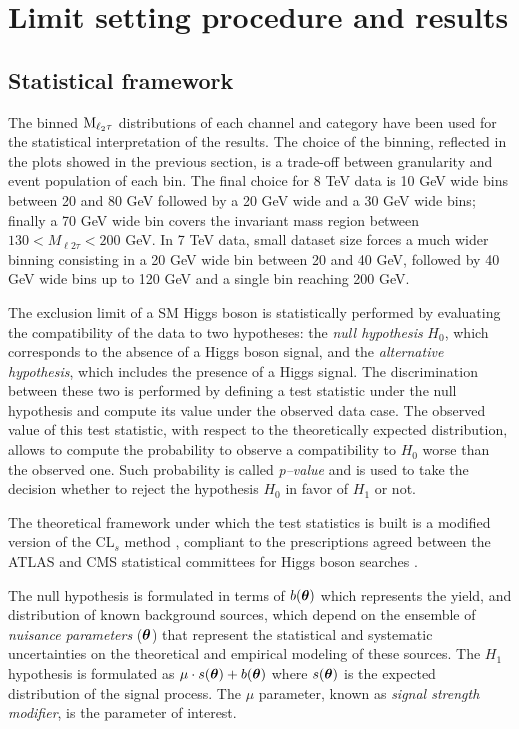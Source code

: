\section{Limit setting procedure and results}

\subsection{Statistical framework}
The binned $\rm{M}_{\ell_2 \tau}$ distributions of each channel and category have been used for the statistical interpretation of the results. The choice of the binning, reflected in the plots showed in the previous section, is a trade-off between granularity and event population of each bin. The final choice for 8 TeV data is 10 GeV wide bins between 20 and 80 GeV followed by a 20 GeV wide and a 30 GeV wide bins; finally a 70 GeV wide bin covers the invariant mass region between $130 < M_{\ell 2 \tau} < 200$ GeV. In 7 TeV data, small dataset size forces a much wider binning consisting in a 20 GeV wide bin between 20 and 40 GeV, followed by 40 GeV wide bins up to 120 GeV and a single bin reaching 200 GeV.

The exclusion limit of a SM Higgs boson is statistically performed by evaluating the compatibility of the data to two hypotheses: the \emph{null hypothesis} $H_0$, which corresponds to the absence of a Higgs boson signal, and the  \emph{alternative hypothesis}, which includes the presence of a Higgs signal. The discrimination between these two is performed by defining a test statistic under the null hypothesis and compute its value under the observed data case. The observed value of this test statistic, with respect to the theoretically expected distribution, allows to compute the probability to observe a compatibility to $H_0$ worse than the observed one. Such probability is called \emph{p--value} and is used to take the decision whether to reject the hypothesis $H_0$ in favor of $H_1$ or not.

The theoretical framework under which the test statistics is built is a modified version of the CL$_s$ method \cite{CLs}, compliant to the prescriptions agreed between the ATLAS and CMS statistical committees for Higgs boson searches \cite{higgscombo}.

The null hypothesis is formulated in terms of $b(\boldtheta)$ which represents the yield, and distribution of known background sources, which depend on the ensemble of \emph{nuisance parameters} ($\boldtheta$) that represent the statistical and systematic uncertainties on the theoretical and empirical modeling of these sources. The $H_1$ hypothesis is formulated as  $\mu \cdot s(\boldtheta) + b(\boldtheta)$ where $s(\boldtheta)$ is the expected distribution of the signal process. The $\mu$ parameter, known as \emph{signal strength modifier}, is the parameter of interest.

